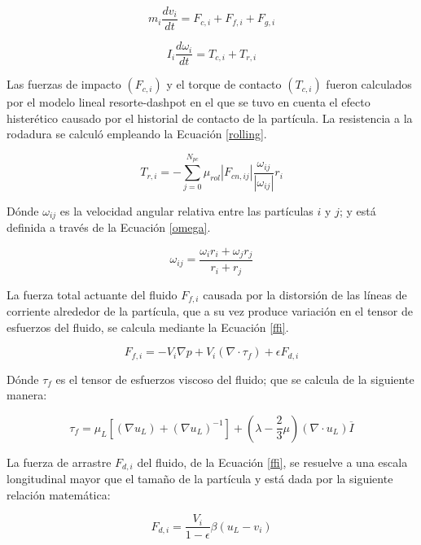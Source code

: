 \begin{equation}
	m_i \frac{d v _i}{dt} = F_{c,i} + F_{f,i} + F_{g,i}
	\label{DEMdyn}
\end{equation}

\begin{equation}
	I_i \frac{d \omega _i}{dt} = T_{c,i} + T_{r,i}
	\label{DEMrot}
\end{equation}

\noindent
\justify

Las fuerzas de impacto $\left( F_{c,i} \right)$ y el torque de contacto $\left( T_{c,i} \right)$ fueron calculados por el modelo lineal resorte-dashpot en el que se tuvo en cuenta el efecto hister\'etico causado por el historial de contacto de la part\'icula. La resistencia a la rodadura se calcul\'o empleando la Ecuaci\'on \ref{rolling}.

\begin{equation}
	T_{r,i} = - \sum _{j=0} ^{N_{pc}} \mu _{rol}  \left|F_{cn, ij} \right| \frac{\omega _{ij}}{\left| \omega _{ij} \right|} r_i
	\label{rolling}
\end{equation}

\noindent
\justify

D\'onde $\omega _{ij}$ es la velocidad angular relativa entre las part\'iculas $i$ y $j$; y est\'a definida a trav\'es de la Ecuaci\'on \ref{omega}.

\begin{equation}
	\omega _{ij} = \frac{\omega _i r_i + \omega _j r_j}{r_i + r_j}
	\label{omega}
\end{equation}

\noindent
\justify

La fuerza total actuante del fluido $F_{f,i}$ causada por la distorsi\'on de las l\'ineas de corriente alrededor de la part\'icula, que a su vez produce variaci\'on en el tensor de esfuerzos del fluido, se calcula mediante la Ecuaci\'on \ref{ffi}.

\begin{equation}
	F_{f,i} = - V_i \nabla p + V_i \left( \nabla \cdot \tau _f \right) + \epsilon F_{d,i}
	\label{ffi}
\end{equation}

\noindent
\justify

D\'onde $\tau _f$ es el tensor de esfuerzos viscoso del fluido; que se calcula de la siguiente manera:

\begin{equation}
	\tau _f = \mu _L \left[ \left( \nabla u_L \right) + \left( \nabla u_L \right) ^{-1} \right] + \left(\lambda - \frac{2}{3} \mu \right) \left( \nabla \cdot u_L \right) \overline{I}
\end{equation}

\noindent
\justify

La fuerza de arrastre $F_{d,i}$ del fluido, de la Ecuaci\'on \ref{ffi}, se resuelve a una escala longitudinal mayor que el tama\~no de la part\'icula y est\'a dada por la siguiente relaci\'on matem\'atica:

\begin{equation}
	F_{d,i} = \frac{V_i}{1 - \epsilon} \beta \left( u_L - v_i \right)
\end{equation}